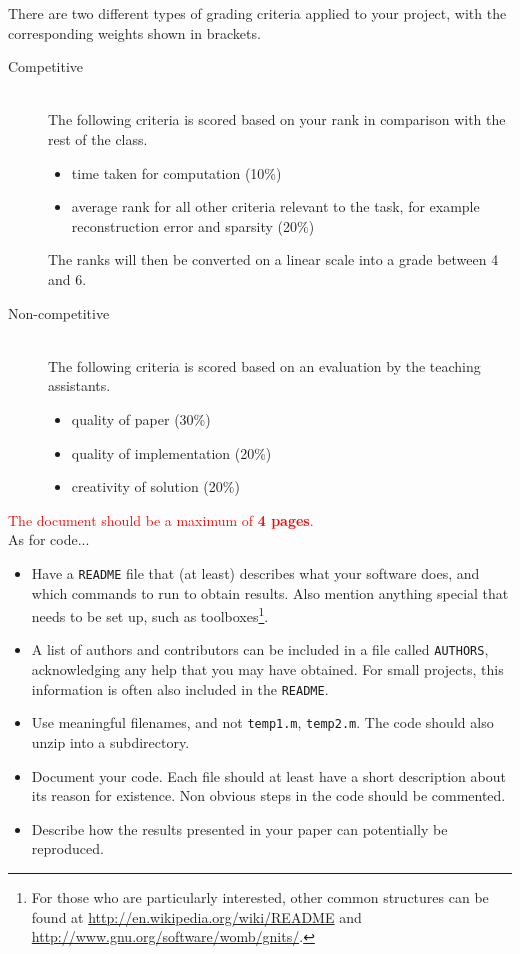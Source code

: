 \documentclass[10pt,conference,compsocconf]{IEEEtran}
\begin{document}
There are two different types of grading criteria applied to your
project, with the corresponding weights shown in brackets.
\begin{description}
\item[Competitive] \ \\
  The following criteria is scored based on your rank
  in comparison with the rest of the class.
  \begin{itemize}
  \item time taken for computation (10\%)
  \item average rank for all other criteria relevant to the task, for
    example reconstruction error and sparsity (20\%)
  \end{itemize}
  The ranks will then be converted on a linear scale into a grade
  between 4 and 6.
\item[Non-competitive] \ \\
  The following criteria is scored based on an
  evaluation by the teaching assistants.
  \begin{itemize}
  \item quality of paper (30\%)
  \item quality of implementation (20\%)
  \item creativity of solution (20\%)
  \end{itemize}
\end{description}

\textcolor{red}{The document should be a maximum of {\bf 4 pages}.}\\

As for code...
\begin{itemize}
\item Have a \texttt{README} file that (at least) describes what your
  software does, and which commands to run to obtain results. Also
  mention anything special that needs to be set up, such as
  toolboxes\footnote{For those who are
  particularly interested, other common structures can be found at
  \url{http://en.wikipedia.org/wiki/README} and
  \url{http://www.gnu.org/software/womb/gnits/}.}.
\item A list of authors and contributors can be included in a file
  called \texttt{AUTHORS}, acknowledging any help that you may have
  obtained. For small projects, this information is often also
  included in the \texttt{README}.
\item Use meaningful filenames, and not \texttt{temp1.m},
  \texttt{temp2.m}. The code should also unzip into a subdirectory.
\item Document your code. Each file should at least have a short
  description about its reason for existence. Non obvious steps in the
  code should be commented.
\item Describe how the results presented in your paper can potentially
  be reproduced.
\end{itemize}
\end{document}

